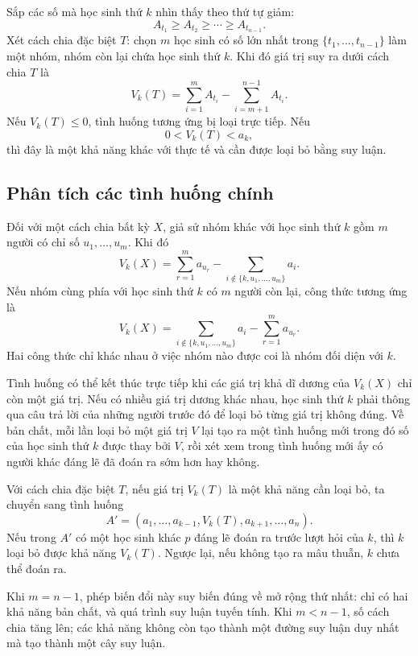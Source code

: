 \documentclass[11pt]{article}
\begin{document}
Sắp các số mà học sinh thứ \(k\) nhìn thấy theo thứ tự giảm:
\[
  A_{t_1}\ge A_{t_2}\ge \cdots\ge A_{t_{n-1}}.
\]
Xét cách chia đặc biệt \(T\): chọn \(m\) học sinh có số lớn nhất trong
\(\{t_1,\ldots,t_{n-1}\}\) làm một nhóm, nhóm còn lại chứa học sinh thứ
\(k\). Khi đó giá trị suy ra dưới cách chia \(T\) là
\[
  V_k(T)=\sum_{i=1}^m A_{t_i}
        -\sum_{i=m+1}^{n-1}A_{t_i}.
\]
Nếu \(V_k(T)\le 0\), tình huống tương ứng bị loại trực tiếp. Nếu
\[
  0<V_k(T)<a_k,
\]
thì đây là một khả năng khác với thực tế và cần được loại bỏ bằng suy luận.

\subsection*{Phân tích các tình huống chính}

Đối với một cách chia bất kỳ \(X\), giả sử nhóm khác với học sinh thứ \(k\)
gồm \(m\) người có chỉ số \(u_1,\ldots,u_m\). Khi đó
\[
  V_k(X)=\sum_{r=1}^m a_{u_r}
  -\sum_{i\notin\{k,u_1,\ldots,u_m\}} a_i.
\]
Nếu nhóm cùng phía với học sinh thứ \(k\) có \(m\) người còn lại, công thức
tương ứng là
\[
  V_k(X)=
  \sum_{i\notin\{k,u_1,\ldots,u_m\}} a_i
  -\sum_{r=1}^m a_{u_r}.
\]
Hai công thức chỉ khác nhau ở việc nhóm nào được coi là nhóm đối diện với
\(k\).

Tình huống có thể kết thúc trực tiếp khi các giá trị khả dĩ dương của
\(V_k(X)\) chỉ còn một giá trị. Nếu có nhiều giá trị dương khác nhau, học
sinh thứ \(k\) phải thông qua câu trả lời của những người trước đó để loại bỏ
từng giá trị không đúng. Về bản chất, mỗi lần loại bỏ một giá trị \(V\) lại
tạo ra một tình huống mới trong đó số của học sinh thứ \(k\) được thay bởi
\(V\), rồi xét xem trong tình huống mới ấy có người khác đáng lẽ đã đoán ra
sớm hơn hay không.

Với cách chia đặc biệt \(T\), nếu giá trị \(V_k(T)\) là một khả năng cần loại
bỏ, ta chuyển sang tình huống
\[
  A'=(a_1,\ldots,a_{k-1},V_k(T),a_{k+1},\ldots,a_n).
\]
Nếu trong \(A'\) có một học sinh khác \(p\) đáng lẽ đoán ra trước lượt hỏi
của \(k\), thì \(k\) loại bỏ được khả năng \(V_k(T)\). Ngược lại, nếu không
tạo ra mâu thuẫn, \(k\) chưa thể đoán ra.

Khi \(m=n-1\), phép biến đổi này suy biến đúng về mở rộng thứ nhất: chỉ có
hai khả năng bản chất, và quá trình suy luận tuyến tính. Khi \(m<n-1\), số
cách chia tăng lên; các khả năng không còn tạo thành một đường suy luận duy
nhất mà tạo thành một cây suy luận.
\end{document}
